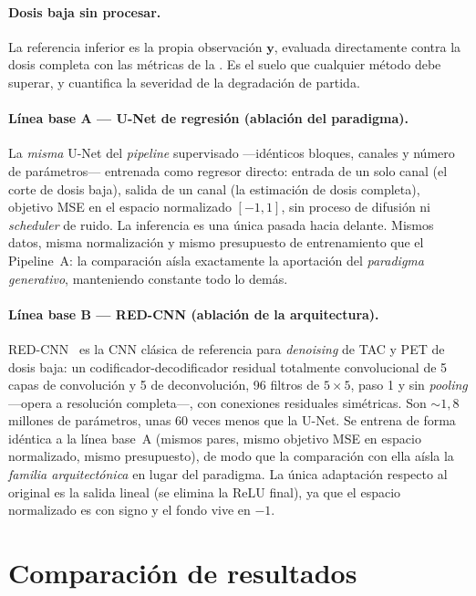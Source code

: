 \paragraph{Dosis baja sin procesar.}
La referencia inferior es la propia observación $\mathbf{y}$,
evaluada directamente contra la dosis completa con las métricas de
la . Es el suelo que cualquier método debe
superar, y cuantifica la severidad de la degradación de partida.

\paragraph{Línea base A — U-Net de regresión (ablación del
paradigma).}
La \emph{misma} U-Net del \textit{pipeline} supervisado —idénticos
bloques, canales y número de parámetros— entrenada como regresor
directo: entrada de un solo canal (el corte de dosis baja), salida
de un canal (la estimación de dosis completa), objetivo MSE en el
espacio normalizado $[-1, 1]$, sin proceso de difusión ni
\textit{scheduler} de ruido. La inferencia es una única pasada hacia
delante. Mismos datos, misma normalización y mismo presupuesto de
entrenamiento que el Pipeline~A: la comparación aísla exactamente la
aportación del \emph{paradigma generativo}, manteniendo constante
todo lo demás.

\paragraph{Línea base B — RED-CNN (ablación de la arquitectura).}
RED-CNN~\cite{redcnn2017} es la CNN clásica de referencia para
\textit{denoising} de TAC y PET de dosis baja: un
codificador-decodificador residual totalmente convolucional de 5
capas de convolución y 5 de deconvolución, 96 filtros de
$5 \times 5$, paso 1 y sin \textit{pooling} —opera a resolución
completa—, con conexiones residuales simétricas. Son
$\sim 1{,}8$ millones de parámetros, unas 60 veces menos que la
U-Net. Se entrena de forma idéntica a la línea base~A (mismos pares,
mismo objetivo MSE en espacio normalizado, mismo presupuesto), de
modo que la comparación con ella aísla la \emph{familia
arquitectónica} en lugar del paradigma. La única adaptación respecto
al original es la salida lineal (se elimina la ReLU final), ya que
el espacio normalizado es con signo y el fondo vive en $-1$.

\section{Comparación de resultados}
\label{sec:pet-resultados}

